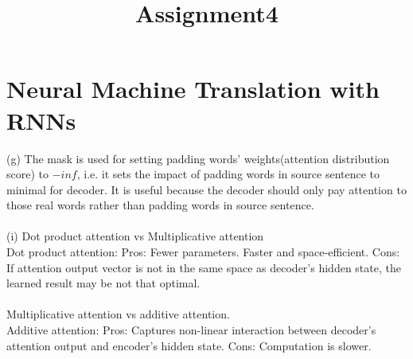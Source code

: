 \documentclass[11pt]{article}
\title{Assignment4}
\begin{document}
\maketitle
\section{Neural Machine Translation with RNNs}
(g) The mask is used for setting padding words' weights(attention distribution score) to $-inf$, i.e. it sets the impact of padding words in source sentence to minimal for decoder. It is useful because the decoder should only pay attention to those real words rather than padding words in source sentence.\\\\
(i) Dot product attention vs Multiplicative attention \\
Dot product attention: Pros: Fewer parameters. Faster and space-efficient. Cons: If attention output vector is not in the same space as decoder's hidden state, the learned result may be not that optimal.\\\\
Multiplicative attention vs additive attention.\\
Additive attention: Pros: Captures non-linear interaction between decoder's attention output and encoder's hidden state. Cons: Computation is slower.
\end{document}
